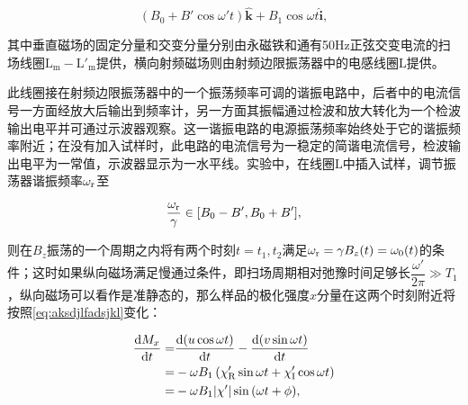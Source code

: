 \begin{equation}
(B_0+B'\cos{\omega' t})\hat{\boldsymbol{k}}+B_1\cos{\omega t}\hat{\boldsymbol{i}},
\end{equation}

其中垂直磁场的固定分量和交变分量分别由永磁铁和通有50Hz正弦交变电流的扫场线圈\(\mathrm{L_m-L'_m}\)提供，横向射频磁场则由射频边限振荡器中的电感线圈\(\mathrm{L}\)提供。

此线圈接在射频边限振荡器中的一个振荡频率可调的谐振电路中，后者中的电流信号一方面经放大后输出到频率计，另一方面其振幅通过检波和放大转化为一个检波输出电平并可通过示波器观察。这一谐振电路的电源振荡频率始终处于它的谐振频率附近；在没有加入试样时，此电路的电流信号为一稳定的简谐电流信号，检波输出电平为一常值，示波器显示为一水平线。实验中，在线圈\(\mathrm{L}\)中插入试样，调节振荡器谐振频率\(\omega_{\rm r}\)至

\begin{equation}
\dfrac{\omega_{\rm r}}{\gamma}\in[B_0-B',B_0+B'],
\end{equation}

则在\(B_z\)振荡的一个周期之内将有两个时刻\(t=t_1,t_2\)满足\(\omega_{\rm r} = \gamma B_z(t)= \omega_0(t)\)的条件；这时如果纵向磁场满足慢通过条件，即扫场周期相对弛豫时间足够长\(\dfrac{\omega'}{2\pi}\gg T_1\)，纵向磁场可以看作是准静态的，那么样品的极化强度\(x\)分量在这两个时刻附近将按照\cref{eq:aksdjlfadsjkl}变化：

\begin{equation}
\begin{aligned}
\dfrac{{\rm d}M_x}{{\rm d}t} = & \dfrac{{\rm d}(u\cos{\omega t})}{{\rm d}t}-\dfrac{{\rm d}(v\sin{\omega t})}{{\rm d}t}\\
 = &-\omega B_1\left(\chi'_{\rm R}\sin{\omega t}+\chi'_{\rm I}\cos{\omega t}\right)\\
 = &-\omega B_1|\chi'|\sin{(\omega t+\phi)},
\end{aligned}\label{eq:lll}
\end{equation}

